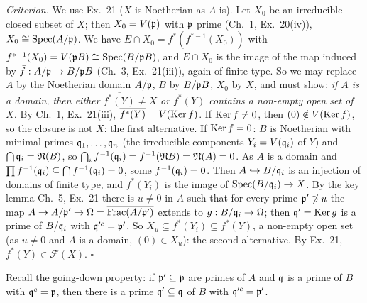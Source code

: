 \documentclass[11pt]{article}
\begin{document}
\emph{Criterion.} We use Ex.~21 ($X$ is Noetherian as $A$ is). Let $X_0$ be an irreducible closed subset of $X$; then $X_0=V(\mathfrak p)$ with $\mathfrak p$ prime (Ch.~1, Ex.~20(iv)), $X_0\cong\operatorname{Spec}(A/\mathfrak p)$. We have $E\cap X_0=f^*(f^{*-1}(X_0))$ with $f^{*-1}(X_0)=V(\mathfrak p B)\cong\operatorname{Spec}(B/\mathfrak p B)$, and $E\cap X_0$ is the image of the map induced by $\bar f:A/\mathfrak p\to B/\mathfrak p B$ (Ch.~3, Ex.~21(iii)), again of finite type. So we may replace $A$ by the Noetherian domain $A/\mathfrak p$, $B$ by $B/\mathfrak p B$, $X_0$ by $X$, and must show: \emph{if $A$ is a domain, then either $\overline{f^*(Y)}\ne X$ or $f^*(Y)$ contains a non-empty open set of $X$.} By Ch.~1, Ex.~21(iii), $\overline{f^*(Y)}=V(\operatorname{Ker} f)$. If $\operatorname{Ker} f\ne0$, then $(0)\notin V(\operatorname{Ker} f)$, so the closure is not $X$: the first alternative. If $\operatorname{Ker} f=0$: $B$ is Noetherian with minimal primes $\mathfrak q_1,\dots,\mathfrak q_n$ (the irreducible components $Y_i=V(\mathfrak q_i)$ of $Y$) and $\bigcap\mathfrak q_i=\mathfrak N(B)$, so $\bigcap_if^{-1}(\mathfrak q_i)=f^{-1}(\mathfrak N B)=\mathfrak N(A)=0$. As $A$ is a domain and $\prod f^{-1}(\mathfrak q_i)\subseteq\bigcap f^{-1}(\mathfrak q_i)=0$, some $f^{-1}(\mathfrak q_i)=0$. Then $A\hookrightarrow B/\mathfrak q_i$ is an injection of domains of finite type, and $f^*(Y_i)$ is the image of $\operatorname{Spec}(B/\mathfrak q_i)\to X$. By the key lemma Ch.~5, Ex.~21 there is $u\ne0$ in $A$ such that for every prime $\mathfrak p'\not\ni u$ the map $A\to A/\mathfrak p'\to\Omega=\overline{\operatorname{Frac}(A/\mathfrak p')}$ extends to $g:B/\mathfrak q_i\to\Omega$; then $\mathfrak q'=\operatorname{Ker} g$ is a prime of $B/\mathfrak q_i$ with $\mathfrak q'^c=\mathfrak p'$. So $X_u\subseteq f^*(Y_i)\subseteq f^*(Y)$, a non-empty open set (as $u\ne0$ and $A$ is a domain, $(0)\in X_u$): the second alternative. By Ex.~21, $f^*(Y)\in\mathcal F(X)$. \hfill$\square$

\pf
Recall the going-down property: if $\mathfrak p'\subseteq\mathfrak p$ are primes of $A$ and $\mathfrak q$ is a prime of $B$ with $\mathfrak q^c=\mathfrak p$, then there is a prime $\mathfrak q'\subseteq\mathfrak q$ of $B$ with $\mathfrak q'^c=\mathfrak p'$.
\end{document}
